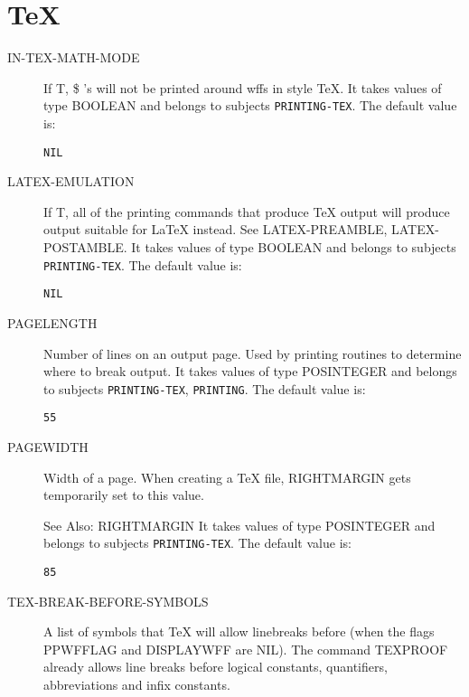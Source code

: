 \section{TeX}

\begin{description} 
\item[IN-TEX-MATH-MODE]  
If T, \$ 's will not be printed around wffs in style TeX.
It takes values of type BOOLEAN and belongs to subjects \texttt{PRINTING-TEX}.  The default value is: \begin{lstlisting}
NIL
\end{lstlisting}

\item[LATEX-EMULATION]  
If T, all of the printing commands that produce TeX output
will produce output suitable for LaTeX instead. See LATEX-PREAMBLE,
LATEX-POSTAMBLE.
It takes values of type BOOLEAN and belongs to subjects \texttt{PRINTING-TEX}.  The default value is: \begin{lstlisting}
NIL
\end{lstlisting}

\item[PAGELENGTH]  
Number of lines on an output page.  Used by printing routines to
determine where to break output.
It takes values of type POSINTEGER and belongs to subjects \texttt{PRINTING-TEX}, \texttt{PRINTING}.  The default value is: \begin{lstlisting}
55
\end{lstlisting}

\item[PAGEWIDTH]  
Width of a page.  When creating a TeX file, RIGHTMARGIN gets
temporarily set to this value.

See Also: RIGHTMARGIN
It takes values of type POSINTEGER and belongs to subjects \texttt{PRINTING-TEX}.  The default value is: \begin{lstlisting}
85
\end{lstlisting}

\item[TEX-BREAK-BEFORE-SYMBOLS]  
A list of symbols that TeX will allow linebreaks before (when the
flags PPWFFLAG and DISPLAYWFF are NIL).  The command TEXPROOF already allows
line breaks before logical constants, quantifiers, abbreviations and
infix constants.


\end{description}
